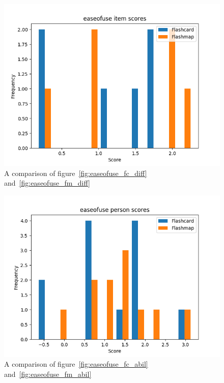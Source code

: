 \begin{figure}
    \includegraphics[width=\textwidth]{img/easeofuse_diff.png}
    \caption{A comparison of figure~\protect\ref{fig:easeofuse_fc_diff} and~\protect\ref{fig:easeofuse_fm_diff}}
    \label{fig:easeofuse_diff}
\end{figure}
\begin{figure}
    \includegraphics[width=\textwidth]{img/easeofuse_abil.png}
    \caption{A comparison of figure~\protect\ref{fig:easeofuse_fc_abil} and~\protect\ref{fig:easeofuse_fm_abil}}
    \label{fig:easeofuse_abil}
\end{figure}
